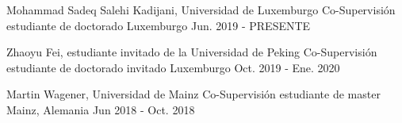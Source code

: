
\begin{cventries}

  \cventry
    {Mohammad Sadeq Salehi Kadijani, Universidad de Luxemburgo} %
    {Co-Supervisión estudiante de doctorado} %
    {Luxemburgo} %
    {Jun. 2019 - PRESENTE} %
    {
    }

  \cventry
    {Zhaoyu Fei, estudiante invitado de la Universidad de Peking} %
    {Co-Supervisión estudiante de doctorado invitado} %
    {Luxemburgo} %
    {Oct. 2019 - Ene. 2020} %
    {
    }

  \cventry
    {Martin Wagener, Universidad de Mainz} %
    {Co-Supervisión estudiante de master} %
    {Mainz, Alemania} %
    {Jun 2018 - Oct. 2018} %
    {
    }

\end{cventries}
